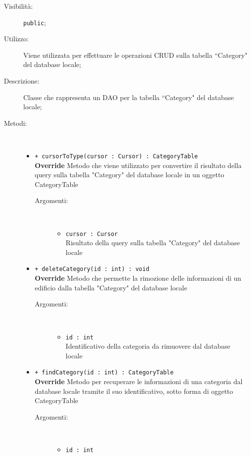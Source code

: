 \documentclass[../DefinizioneDiProdotto.tex]{subfiles}
\begin{document}
\begin{description}
\begin{itemize}
\end{itemize}
\item[Visibilità:] \texttt{public};
\item[Utilizzo:] Viene utilizzata per effettuare le operazioni CRUD sulla tabella “Category" del database locale;
\item[Descrizione:] Classe che rappresenta un DAO per la tabella “Category" del database locale;
\item[Metodi:] \
\begin{itemize}
\item \texttt{+ cursorToType(cursor : Cursor) : CategoryTable}\\
\textbf{Override} Metodo che viene utilizzato per convertire il risultato della query sulla tabella "Category" del database locale in un oggetto CategoryTable
 \begin{description}
\item[Argomenti:] \
\begin{itemize}
\item \texttt{cursor : Cursor}\\
Risultato della query sulla tabella "Category" del database locale\end{itemize}
\end{description}
\item \texttt{+ deleteCategory(id : int) : void}\\
\textbf{Override} Metodo che permette la rimozione delle informazioni di un edificio dalla tabella "Category" del database locale
 \begin{description}
\item[Argomenti:] \
\begin{itemize}
\item \texttt{id : int}\\
Identificativo della categoria da rimuovere dal database locale\end{itemize}
\end{description}
\item \texttt{+ findCategory(id : int) : CategoryTable}\\
\textbf{Override} Metodo per recuperare le informazioni di una categoria dal database locale tramite il suo identificativo, sotto forma di oggetto CategoryTable
 \begin{description}
\item[Argomenti:] \
\begin{itemize}
\item \texttt{id : int}\\

\end{itemize}
\end{description}
\end{itemize}
\end{description}
\end{document}
